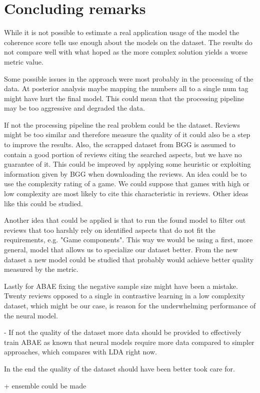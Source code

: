 \section{Concluding remarks}

While it is not possible to estimate a real application usage of the model the
coherence score tells use enough about the models on the dataset.
The results do not compare well with what hoped as the more complex solution yields a worse metric value.

Some possible issues in the approach were most probably in the processing of the data.
At posterior analysis maybe mapping the numbers all to a single num tag might have hurt the final model.
This could mean that the processing pipeline may be too aggressive and degraded the data.

If not the processing pipeline the real problem could be the dataset.
Reviews might be too similar and therefore measure the quality of it could also be a step to improve the results.
Also, the scrapped dataset from BGG is assumed to contain a good portion of reviews citing the searched aspects,
but we have no guarantee of it.
This could be improved by applying some heuristic or exploiting information given by BGG when downloading the reviews.
An idea could be to use the complexity rating of a game.
We could suppose that games with high or low complexity are most likely to cite this characteristic in reviews.
Other ideas like this could be studied.


Another idea that could be applied is that to run the found model to filter out reviews that too harshly rely
on identified aspects that do not fit the requirements, e.g. "Game components".
This way we would be using a first, more general, model that allows us to specialize our dataset better.
From the new dataset a new model could be studied that probably would achieve better quality measured by the metric.

Lastly for ABAE fixing the negative sample size might have been a mistake.
Twenty reviews opposed to a single in contrastive learning in a low complexity dataset, which
might be our case, is reason for the underwhelming performance of the neural model.

- If not the quality of the dataset more data should be provided to effectively train ABAE as known
that neural models require more data compared to simpler approaches, which compares with LDA right now.


In the end the quality of the dataset should have been better took care for.

+ ensemble could be made